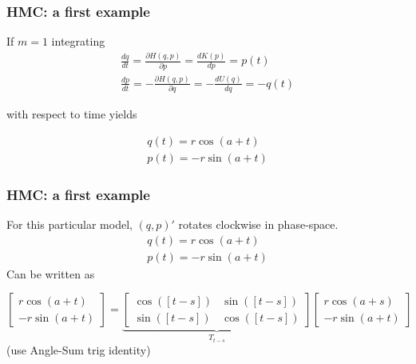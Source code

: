 \documentclass{beamer}
\begin{document}
\begin{frame}
\frametitle{HMC: a first example}

If $m=1$ integrating 
\begin{gather}
\frac{dq}{dt} = \frac{\partial H(q,p)}{\partial p} =  \frac{d K(p) }{d p} = p(t) \\
\frac{dp}{dt} = -\frac{\partial H(q,p)}{\partial q} = -\frac{d U(q)}{d q} = -q(t)
\end{gather}

with respect to time yields


\begin{gather}
q(t) = r \cos(a + t)\\
p(t) = -r \sin(a + t)
\end{gather}


\end{frame}

\begin{frame}
\frametitle{HMC: a first example}

For this particular model, $(q,p)'$ rotates clockwise in phase-space.
\begin{gather}
q(t) = r \cos(a + t)\\
p(t) = -r \sin(a + t)
\end{gather}
Can be written as 

$$
\left[\begin{array}{c}
r \cos(a + t) \\
-r \sin(a + t) 
\end{array}\right]
=
\underbrace{
\left[\begin{array}{cc}
\cos([t-s]) & \sin([t-s]) \\
\sin([t-s])  & \cos([t-s])
\end{array}\right]}
_{T_{t-s}}
\left[\begin{array}{c}
r \cos(a + s) \\
-r \sin(a + t) 
\end{array}\right]
$$
(use Angle-Sum trig identity)
\end{frame}
\end{document}
